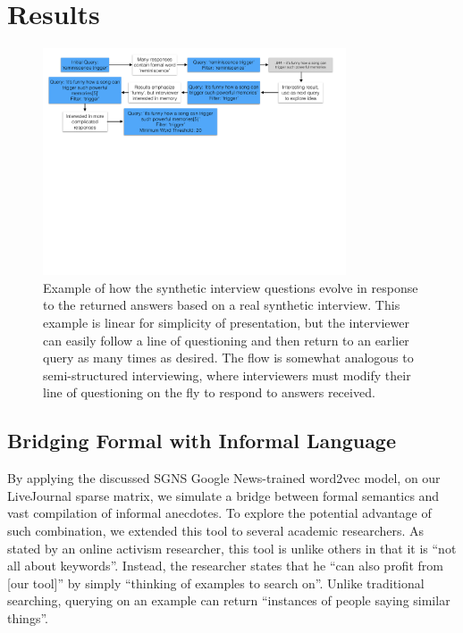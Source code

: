 \documentclass{sigchi}
\begin{document}
\section{Results}

\begin{figure}[htb]
\centering \includegraphics[width=0.8\textwidth]{figures/InterviewFlow.pdf} 
\caption{Example of how the synthetic interview questions evolve in response to the returned answers based on a real synthetic interview. This example is linear for simplicity of presentation, but the interviewer can easily follow a line of questioning and then return to an earlier query as many times as desired. The flow is somewhat analogous to semi-structured interviewing, where interviewers must modify their line of questioning on the fly to respond to answers received.}
\end{figure}



\subsection{Bridging Formal with Informal Language}
By applying the discussed SGNS Google News-trained word2vec model, on our LiveJournal sparse matrix, we simulate a bridge between formal semantics and vast compilation of informal anecdotes. To explore the potential advantage of such combination, we extended this tool to several academic researchers. As stated by an online activism researcher, this tool is unlike others in that it is ``not all about keywords''. Instead, the researcher states that he ``can also profit from [our tool]'' by simply ``thinking of examples to search on''. Unlike traditional searching, querying on an example can return ``instances of people saying similar things''. 
\end{document}

